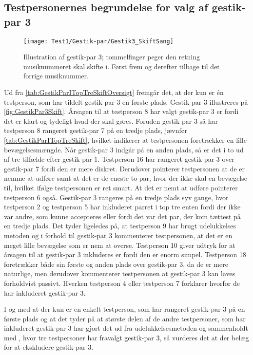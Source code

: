 \subsection{Testpersonernes begrundelse for valg af gestik-par 3}
\label{TestresultaterValgAfGestikkerBegrundelseGP3Skift}
% 
%
\begin{figure}[H]
	\centering
	\texttt{[image: Test1/Gestik-par/Gestik3\_SkiftSang]}
	\caption{Illustration af gestik-par 3; tommelfinger peger den retning musiknummeret skal skifte i. Først frem og derefter tilbage til det forrige musiknummer.}
	\label{fig:GestikPar3Skift}
\end{figure}
\noindent
% 
Ud fra \autoref{tab:GestikParITopTreSkiftOversigt} fremgår det, at der kun er én testperson, som har tildelt gestik-par 3 en første plads. Gestik-par 3 illustreres på \autoref{fig:GestikPar3Skift}. Årsagen til at testperson 8 har valgt gestik-par 3 er fordi det er klart og tydeligt hvad der skal gøres. Foruden gestik-par 3 så har testperson 8 rangeret gestik-par 7 på en tredje plads, jævnfør \autoref{tab:GestikParITopTreSkift}, hvilket indikerer at testpersonen foretrækker en lille bevægelsesmængde. Når gestik-par 3 indgår på en anden plads, så er det i to ud af tre tilfælde efter gestik-par 1. Testperson 16 har rangeret gestik-par 3 over gestik-par 7 fordi den er mere diskret. Derudover pointerer testpersonen at de er nemme at udføre samt at det er de eneste to par, hvor der ikke skal en bevægelse til, hvilket ifølge testpersonen er ret smart. At det er nemt at udføre pointerer testperson 6 også. Gestik-par 3 rangeres på en tredje plads syv gange, hvor testperson 2 og testperson 5 har inkluderet parret i top tre enten fordi der ikke var andre, som kunne accepteres eller fordi det var det par, der kom tættest på en tredje plads. Det tyder ligeledes på, at testperson 9 har brugt udelukkelses metoden og i forhold til gestik-par 3 kommenterer testpersonen, at det er en meget lille bevægelse som er nem at overse. Testperson 10 giver udtryk for at årsagen til at gestik-par 3 inkluderes er fordi den er enorm simpel. Testperson 18 foretrækker både sin første og anden plads over gestik-par 3, da de er mere naturlige, men derudover kommenterer testpersonen at gestik-par 3 kan laves forholdvist passivt. Hverken testperson 4 eller testperson 7 forklarer hvorfor de har inkluderet gestik-par 3. 

I og med at der kun er en enkelt testperson, som har rangeret gestik-par 3 på en første plads og at det tyder på at største delen af de andre testpersoner, som har inkluderet gestik-par 3 har gjort det ud fra udelukkelsesmetoden og sammenholdt med , hvor tre testpersoner har fravalgt gestik-par 3, så vurderes det at der belæg for at ekskludere gestik-par 3.
%
